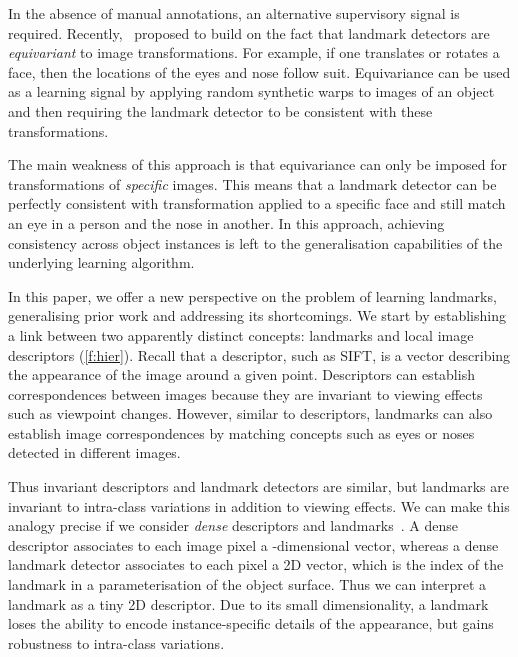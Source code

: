 \documentclass[10pt,twocolumn,letterpaper]{article}
\begin{document}
In the absence of manual annotations, an alternative supervisory signal is required.
Recently,~\cite{thewlis17unsupervised} proposed to build on the fact that landmark detectors are \emph{equivariant} to image transformations.
For example, if one translates or rotates a face, then the locations of the eyes and nose follow suit.
Equivariance can be used as a learning signal by applying random synthetic warps to images of an object and then requiring the landmark detector to be consistent with these transformations.

The main weakness of this approach is that equivariance can only be imposed for transformations of \emph{specific} images.
This means that a landmark detector can be perfectly consistent with transformation applied to a specific face and still match an eye in a person and the nose in another.
In this approach, achieving consistency across object instances is left to the generalisation capabilities of the underlying learning algorithm.

In this paper, we offer a new perspective on the problem of learning landmarks, generalising prior work and addressing its shortcomings.
We start by establishing a link between two apparently distinct concepts: landmarks and local image descriptors (\cref{f:hier}).
Recall that a descriptor, such as SIFT, is a vector describing the appearance of the image around a given point.
Descriptors can establish correspondences between images because they are invariant to viewing effects such as viewpoint changes.
However, similar to descriptors, landmarks can also establish image correspondences by matching concepts such as eyes or noses detected in different images.

Thus invariant descriptors and landmark detectors are similar, but landmarks are invariant to intra-class variations in addition to viewing effects.
We can make this analogy precise if we consider \emph{dense} descriptors and landmarks~\cite{thewlis17Bunsupervised,alp2017densereg,shu2018deforming}.
A dense descriptor associates to each image pixel a -dimensional vector, whereas a dense landmark detector associates to each pixel a 2D vector, which is the index of the landmark in a  parameterisation of the object surface.
Thus we can interpret a landmark as a tiny 2D descriptor.
Due to its small dimensionality, a landmark loses the ability to encode instance-specific details of the appearance, but gains robustness to intra-class variations.
\end{document}
